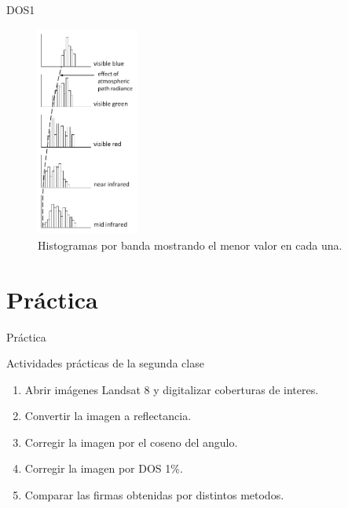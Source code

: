 \documentclass[]{beamer}
\begin{document}
\begin{frame}{DOS1}
  \begin{figure}
  \centering
  \includegraphics[width=0.30\textwidth]{imagenes/dos.png}
  \caption{Histogramas por banda mostrando el menor valor en cada una.}
  \end{figure}
\end{frame}


\section{Práctica}

\begin{frame}{Práctica}
  \begin{exampleblock}{Actividades prácticas de la segunda clase}
    \begin{enumerate}
      \item Abrir imágenes Landsat 8 y digitalizar coberturas de interes.
      \item Convertir la imagen a reflectancia.
      \item Corregir la imagen por el coseno del angulo.
      \item Corregir la imagen por DOS 1\%.
      \item Comparar las firmas obtenidas por distintos metodos.
    \end{enumerate}
  \end{exampleblock}
\end{frame}
\end{document}
